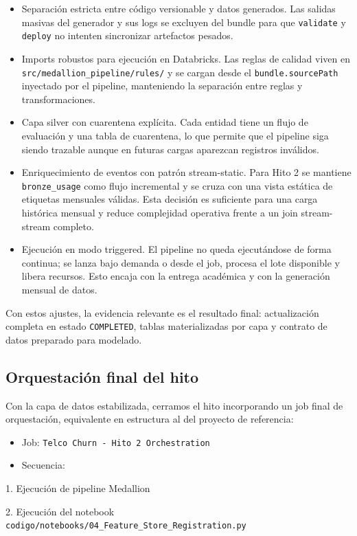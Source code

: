 \documentclass[12pt,a4paper]{article}
\begin{document}
\begin{itemize}
\item Separación estricta entre código versionable y datos generados. Las salidas masivas del generador y sus logs se excluyen del bundle para que \nolinkurl{validate} y \nolinkurl{deploy} no intenten sincronizar artefactos pesados.
\item Imports robustos para ejecución en Databricks. Las reglas de calidad viven en \nolinkurl{src/medallion_pipeline/rules/} y se cargan desde el \nolinkurl{bundle.sourcePath} inyectado por el pipeline, manteniendo la separación entre reglas y transformaciones.
\item Capa silver con cuarentena explícita. Cada entidad tiene un flujo de evaluación y una tabla de cuarentena, lo que permite que el pipeline siga siendo trazable aunque en futuras cargas aparezcan registros inválidos.
\item Enriquecimiento de eventos con patrón stream-static. Para Hito 2 se mantiene \nolinkurl{bronze_usage} como flujo incremental y se cruza con una vista estática de etiquetas mensuales válidas. Esta decisión es suficiente para una carga histórica mensual y reduce complejidad operativa frente a un join stream-stream completo.
\item Ejecución en modo triggered. El pipeline no queda ejecutándose de forma continua; se lanza bajo demanda o desde el job, procesa el lote disponible y libera recursos. Esto encaja con la entrega académica y con la generación mensual de datos.
\end{itemize}

Con estos ajustes, la evidencia relevante es el resultado final: actualización completa en estado \nolinkurl{COMPLETED}, tablas materializadas por capa y contrato de datos preparado para modelado.\par

\subsection{Orquestación final del hito}

Con la capa de datos estabilizada, cerramos el hito incorporando un job final de orquestación, equivalente en estructura al del proyecto de referencia:\par

\begin{itemize}
\item Job: \nolinkurl{Telco Churn - Hito 2 Orchestration}
\item Secuencia:
\end{itemize}
1. Ejecución de pipeline Medallion\par
2. Ejecución del notebook \nolinkurl{codigo/notebooks/04_Feature_Store_Registration.py}\par
\end{document}
